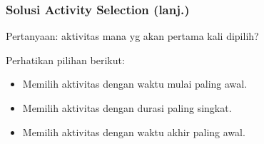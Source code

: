 %
%

\begin{frame}
  \frametitle{Solusi Activity Selection (lanj.)}
  Pertanyaan: aktivitas mana yg akan pertama kali dipilih?\newline

  Perhatikan pilihan berikut:
  \begin{itemize}
    \item Memilih aktivitas dengan waktu mulai paling awal.
    \item Memilih aktivitas dengan durasi paling singkat.
    \item Memilih aktivitas dengan waktu akhir paling awal.
  \end{itemize}
\end{frame}

